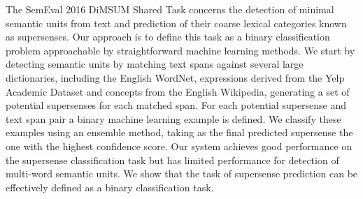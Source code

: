 The SemEval 2016 DiMSUM Shared Task concerns the  detection of minimal semantic units from text and prediction of their coarse lexical categories known as supersenses. Our approach is to define this task as a binary classification problem approachable by straightforward machine learning methods. We start by detecting semantic units by matching text spans against several large dictionaries, including the English WordNet, expressions derived from the Yelp Academic Dataset and concepts from the English Wikipedia, generating a set of potential supersenses for each matched span. For each potential supersense and text span pair a binary machine learning example is defined. We classify these examples using an ensemble method, taking as the final predicted supersense the one with the highest confidence score. Our system achieves good performance on the supersense classification task but has limited performance for detection of multi-word semantic units. We show that the task of supersense prediction can be effectively defined as a binary classification task.
